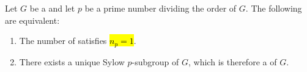 \begin{proposition} \label{proposition:sylow_p_subgroup_is_normal_if_and_only_if_n_p_equals_1}
Let $G$ be a   and let $p$ be a prime number dividing the order of $G$. The following are equivalent:

\begin{enumerate}
    \item The number of  satisfies \hl{$n_p = 1$}.
    \item There exists a unique Sylow $p$-subgroup of $G$, which is therefore a  of $G$.
\end{enumerate}

\end{proposition}
